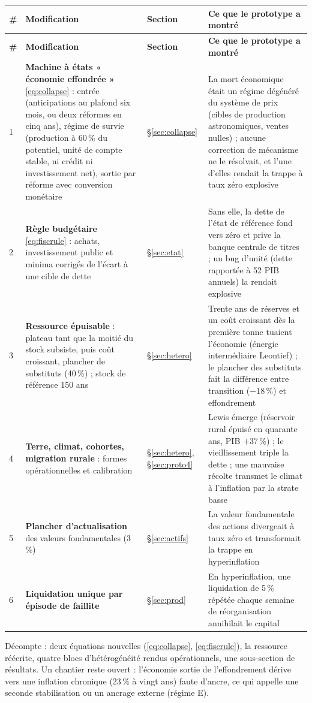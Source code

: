 \documentclass[11pt,a4paper]{article}
\begin{document}
\begin{center}\small
\begin{longtable}{p{0.5cm}p{6.6cm}p{2.1cm}p{5.8cm}}
\toprule
\textbf{\#} & \textbf{Modification} & \textbf{Section} & \textbf{Ce que le prototype a montré}\\
\midrule
\endfirsthead
\toprule
\textbf{\#} & \textbf{Modification} & \textbf{Section} & \textbf{Ce que le prototype a montré}\\
\midrule
\endhead
1 & \textbf{Machine à états « économie effondrée »} \eqref{eq:collapse} : entrée (anticipations au plafond six mois, ou deux réformes en cinq ans), régime de survie (production à 60\,\% du potentiel, unité de compte stable, ni crédit ni investissement net), sortie par réforme avec conversion monétaire & \S\ref{sec:collapse} & La mort économique était un régime dégénéré du système de prix (cibles de production astronomiques, ventes nulles) ; aucune correction de mécanisme ne le résolvait, et l'une d'elles rendait la trappe à taux zéro explosive\\
2 & \textbf{Règle budgétaire} \eqref{eq:fiscrule} : achats, investissement public et minima corrigés de l'écart à une cible de dette & \S\ref{sec:etat} & Sans elle, la dette de l'état de référence fond vers zéro et prive la banque centrale de titres ; un bug d'unité (dette rapportée à 52 PIB annuels) la rendait explosive\\
3 & \textbf{Ressource épuisable} : plateau tant que la moitié du stock subsiste, puis coût croissant, plancher de substituts (40\,\%) ; stock de référence 150 ans & \S\ref{sec:hetero} & Trente ans de réserves et un coût croissant dès la première tonne tuaient l'économie (énergie intermédiaire Leontief) ; le plancher des substituts fait la différence entre transition ($-18\,\%$) et effondrement\\
4 & \textbf{Terre, climat, cohortes, migration rurale} : formes opérationnelles et calibration & \S\ref{sec:hetero}, \S\ref{sec:proto4} & Lewis émerge (réservoir rural épuisé en quarante ans, PIB $+37\,\%$) ; le vieillissement triple la dette ; une mauvaise récolte transmet le climat à l'inflation par la strate basse\\
5 & \textbf{Plancher d'actualisation} des valeurs fondamentales (3\,\%) & \S\ref{sec:actifs} & La valeur fondamentale des actions divergeait à taux zéro et transformait la trappe en hyperinflation\\
6 & \textbf{Liquidation unique par épisode de faillite} & \S\ref{sec:prod} & En hyperinflation, une liquidation de 5\,\% répétée chaque semaine de réorganisation annihilait le capital\\
\bottomrule
\end{longtable}
\end{center}
Décompte : deux équations nouvelles (\eqref{eq:collapse}, \eqref{eq:fiscrule}), la ressource réécrite, quatre blocs d'hétérogénéité rendus opérationnels, une sous-section de résultats. Un chantier reste ouvert : l'économie sortie de l'effondrement dérive vers une inflation chronique (23\,\% à vingt ans) faute d'ancre, ce qui appelle une seconde stabilisation ou un ancrage externe (régime E).
\end{document}
